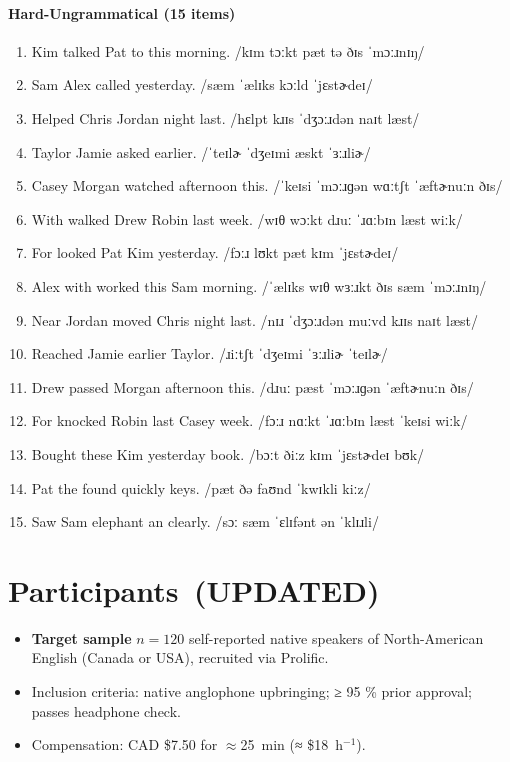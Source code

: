 \documentclass[12pt]{article}
\begin{document}
\paragraph{Hard-Ungrammatical (15 items)}
\begin{enumerate}
\item Kim talked Pat to this morning. /kɪm tɔːkt pæt tə ðɪs ˈmɔːɹnɪŋ/
\item Sam Alex called yesterday. /sæm ˈælɪks kɔːld ˈjɛstɚdeɪ/
\item Helped Chris Jordan night last. /hɛlpt kɹɪs ˈdʒɔːɹdən naɪt læst/
\item Taylor Jamie asked earlier. /ˈteɪlɚ ˈdʒeɪmi æskt ˈɜːɹliɚ/
\item Casey Morgan watched afternoon this. /ˈkeɪsi ˈmɔːɹɡən wɑːtʃt ˈæftɚnuːn ðɪs/
\item With walked Drew Robin last week. /wɪθ wɔːkt dɹuː ˈɹɑːbɪn læst wiːk/
\item For looked Pat Kim yesterday. /fɔːɹ lʊkt pæt kɪm ˈjɛstɚdeɪ/
\item Alex with worked this Sam morning. /ˈælɪks wɪθ wɜːɹkt ðɪs sæm ˈmɔːɹnɪŋ/
\item Near Jordan moved Chris night last. /nɪɹ ˈdʒɔːɹdən muːvd kɹɪs naɪt læst/
\item Reached Jamie earlier Taylor. /ɹiːtʃt ˈdʒeɪmi ˈɜːɹliɚ ˈteɪlɚ/
\item Drew passed Morgan afternoon this. /dɹuː pæst ˈmɔːɹɡən ˈæftɚnuːn ðɪs/
\item For knocked Robin last Casey week. /fɔːɹ nɑːkt ˈɹɑːbɪn læst ˈkeɪsi wiːk/
\item Bought these Kim yesterday book. /bɔːt ðiːz kɪm ˈjɛstɚdeɪ bʊk/
\item Pat the found quickly keys. /pæt ðə faʊnd ˈkwɪkli kiːz/
\item Saw Sam elephant an clearly. /sɔː sæm ˈɛlɪfənt ən ˈklɪɹli/
\end{enumerate}

\section{Participants \,(UPDATED)}
\begin{itemize}
  \item \textbf{Target sample} $n=120$ self-reported native speakers of North-American English (Canada or USA), recruited via Prolific.
  \item Inclusion criteria: native anglophone upbringing; ≥ 95 \% prior approval; passes headphone check.
  \item Compensation: CAD \$7.50 for $\approx$25~min (≈ \$18~h$^{-1}$).
\end{itemize}
\end{document}
